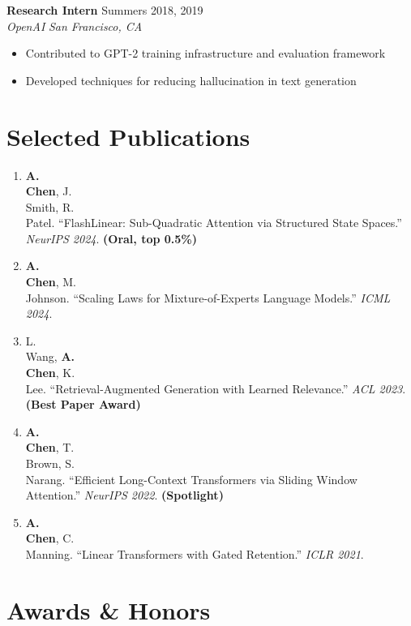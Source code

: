 \documentclass[11pt,a4paper]{article}
\newcommand{\cventry}[4]{%
  \textbf{#1} \hfill {\color{lightgray}#2}\\
  {\color{accent}\textit{#3}} \hfill {\color{lightgray}\textit{#4}}\\[2pt]
}
\newcommand{\cvsep}{\vspace{6pt}}
\begin{document}
\cvsep

\cventry{Research Intern}{Summers 2018, 2019}{OpenAI}{San Francisco, CA}
\begin{itemize}[leftmargin=1.5em, nosep, itemsep=2pt]
  \item Contributed to GPT-2 training infrastructure and evaluation framework
  \item Developed techniques for reducing hallucination in text generation
\end{itemize}

\section{Selected Publications}
{\small
\begin{enumerate}[leftmargin=1.5em, itemsep=3pt]
  \item \textbf{A.\\ Chen}, J.\\ Smith, R.\\ Patel. ``FlashLinear: Sub-Quadratic Attention via Structured State Spaces.'' \textit{NeurIPS 2024}. \textbf{(Oral, top 0.5\%)}
  \item \textbf{A.\\ Chen}, M.\\ Johnson. ``Scaling Laws for Mixture-of-Experts Language Models.'' \textit{ICML 2024}.
  \item L.\\ Wang, \textbf{A.\\ Chen}, K.\\ Lee. ``Retrieval-Augmented Generation with Learned Relevance.'' \textit{ACL 2023}. \textbf{(Best Paper Award)}
  \item \textbf{A.\\ Chen}, T.\\ Brown, S.\\ Narang. ``Efficient Long-Context Transformers via Sliding Window Attention.'' \textit{NeurIPS 2022}. \textbf{(Spotlight)}
  \item \textbf{A.\\ Chen}, C.\\ Manning. ``Linear Transformers with Gated Retention.'' \textit{ICLR 2021}.
\end{enumerate}
}

\section{Awards \& Honors}
\end{document}
